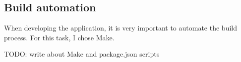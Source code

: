 \subsection{Build automation}\label{sec:build-automation}

When developing the application,
it is very important to automate the build process.
For this task, I chose Make.

TODO: write about Make and package.json scripts
